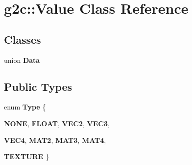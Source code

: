 \hypertarget{classg2c_1_1_value}{
\section{g2c::Value Class Reference}
\label{classg2c_1_1_value}
}
\subsection*{Classes}
\begin{DoxyCompactItemize}
\item 
union {\bfseries Data}
\end{DoxyCompactItemize}
\subsection*{Public Types}
\begin{DoxyCompactItemize}
\item 
enum {\bfseries Type} \{ \par
{\bfseries NONE}, 
{\bfseries FLOAT}, 
{\bfseries VEC2}, 
{\bfseries VEC3}, 
\par
{\bfseries VEC4}, 
{\bfseries MAT2}, 
{\bfseries MAT3}, 
{\bfseries MAT4}, 
\par
{\bfseries TEXTURE}
 \}
\end{DoxyCompactItemize}

